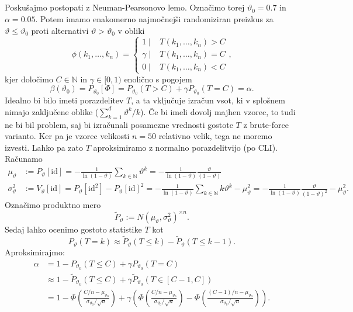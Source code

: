 \documentclass[ letterpaper, titlepage, fleqn]{article}
\newcommand{\N}{\mathbb N}
\newcommand{\id}{\text{id}}
\begin{document}
\subsection{}
Poskušajmo postopati z Neuman-Pearsonovo lemo. Označimo torej $\vartheta_0 = 0.7$ in $\alpha = 0.05$.
Potem imamo enakomerno najmočnejši randomiziran preizkus za $\vartheta \leq \vartheta_0$ proti alternativi
$\vartheta > \vartheta_0$ v obliki
$$
\phi(k_1, \dots, k_n)= 
\begin{cases}
1 \mid & T(k_1, \dots, k_n) > C \\
\gamma \mid &  T(k_1, \dots, k_n) = C \\
0 \mid &  T(k_1, \dots, k_n) < C
\end{cases},
$$
kjer določimo $C \in\N$ in $\gamma \in [0,1)$ enolično s pogojem
$$\beta(\vartheta_0) = P_{\vartheta_0}[\Phi] = P_{\vartheta_0}(T > C) + \gamma P_{\vartheta_0}(T = C) = \alpha.$$
Idealno bi bilo imeti porazdelitev $T$, a ta vključuje izračun vsot, ki v splošnem nimajo zaključene oblike ($\sum_{k=1}^d \vartheta^k / k$). Če bi imeli dovolj majhen vzorec, to tudi ne bi bil problem, saj bi izračunali posamezne vrednosti gostote $T$ z brute-force varianto. Ker pa je vzorec velikosti $n=50$ relativno velik, tega ne moremo izvesti. Lahko pa zato $T$ aproksimiramo z normalno porazdelitvijo (po CLI). Računamo
\begin{equation*}
\begin{aligned}
\mu_\vartheta 
&:= P_{\vartheta}[\id] 
= -\frac{1}{\ln(1 - \vartheta)} \sum_{k\in\N} \vartheta^k 
= - \frac{1}{\ln(1 - \vartheta)}\frac{\vartheta}{(1 - \vartheta)}  \\
\sigma_\vartheta^2 
&:= V_{\vartheta}[\id] 
= P_{\vartheta}[\id^2] - P_{\vartheta}[\id]^2 
= -\frac{1}{\ln(1 - \vartheta)} \sum_{k\in\N} k\vartheta^k - \mu_\vartheta^2 
= -\frac{1}{\ln(1 - \vartheta)} \frac{\vartheta}{(1-\vartheta)^2} - \mu_\vartheta^2.
\end{aligned}
\end{equation*}
Označimo produktno mero
$$\tilde{P}_\vartheta := N(\mu_\vartheta, \sigma_\vartheta^2)^{\times n}.$$
Sedaj lahko ocenimo gostoto statistike $T$ kot
$$P_\vartheta(T = k) \approx \tilde{P}_\vartheta(T \leq k) - \tilde{P}_\vartheta(T \leq k-1).$$
Aproksimirajmo:
\begin{equation*}
\begin{aligned}
\alpha &= 1 - P_{\vartheta_0}(T \leq C) + \gamma P_{\vartheta_0}(T = C) \\
&\approx 1 - \tilde{P}_{\vartheta_0}(T \leq C) + \gamma \tilde{P}_{\vartheta_0}(T \in [C-1, C]) \\
&= 1 - \Phi\left(\frac{C/n - \mu_{\vartheta_0}}{\sigma_{\vartheta_0} / \sqrt{n}}\right) + \gamma\left(
\Phi\left(\frac{C/n - \mu_{\vartheta_0}}{\sigma_{\vartheta_0} / \sqrt{n}}\right) -
\Phi\left(\frac{(C-1)/n - \mu_{\vartheta_0}}{\sigma_{\vartheta_0} / \sqrt{n}}\right)
\right).
\end{aligned}
\end{equation*}
\end{document}
